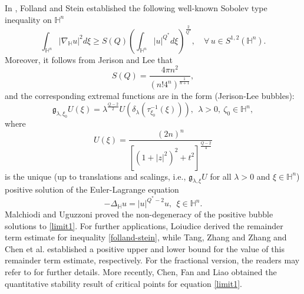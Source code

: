 \documentclass[11pt]{article}
\begin{document}
In \cite{FS74}, Folland and Stein established the following well-known Sobolev type inequality on $\mathbb{H}^{n}$
\begin{equation}\label{folland-stein}
	\int_{\mathbb{H}^{n}}|\nabla_{\mathbb{H}}u|^{2}{d}\xi\geq S(Q)\left(\int_{\mathbb{H}^{n}}|u|^{Q^{\ast}}{d}\xi\right)^{\frac{2}{Q^{\ast}}},\quad \forall \, u\in S^{1,2}(\mathbb{H}^{n}).
\end{equation}
Moreover, it follows from Jerison and Lee \cite{JL88} %
that
\begin{equation*}
  S(Q)=\frac{4\pi n^2}{(n!4^n)^{\frac{1}{n+1}}},
\end{equation*}
and the corresponding extremal functions are in the form (Jerison-Lee bubbles):
\begin{equation}\label{gU}
  \mathfrak{g}_{\lambda,\xi_0}U(\xi)=\lambda^{\frac{Q-2}{2}}U(\delta_\lambda(\tau_{\xi_0}^{-1}(\xi))),
  ~~\lambda>0,~\zeta_{0}\in\mathbb{H}^{n},
\end{equation}
where
	\begin{equation*}%
		U(\xi)=\frac{(2n)^n}{[(1+|z|^{2})^{2}+t^{2}]^{\frac{Q-2}{4}}}
	\end{equation*}
is the unique (up to translations and scalings, i.e., $\mathfrak{g}_{\lambda,\xi}U$ for all $\lambda>0$ and $\xi\in\mathbb{H}^{n}$)
positive solution of the Euler-Lagrange equation
\begin{equation}\label{limit1}
  -\Delta_{\mathbb{H}} u=|u|^{Q^*-2}u,~~\xi\in\mathbb{H}^{n}.
\end{equation}
 Malchiodi and Uguzzoni \cite{MU02} proved the non-degeneracy of the positive bubble solutions to  \eqref{limit1}.
 For further applications, Loiudice \cite{L05} derived the remainder term estimate for inequality
\eqref{folland-stein}, while Tang, Zhang and Zhang \cite{TZZ24} and Chen et al. \cite{CLTW25} established a positive upper and lower bound for the value of this remainder term estimate, respectively. For the fractional version, the readers may refer to
\cite{LZ15} for further details. More recently, Chen, Fan and Liao \cite{CFL25} obtained the quantitative stability result of critical points for equation \eqref{limit1}.
\end{document}
